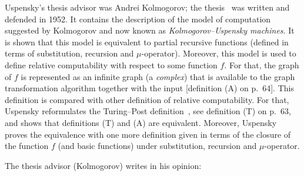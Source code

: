 \documentclass[12pt]{article}
\theoremstyle{remark}
\begin{document}
Uspensky's thesis advisor was Andrei Kolmogorov; the thesis~\cite{1952} was written and defended in 1952. It contains the description of the model of computation suggested by Kolmogorov and now known as \emph{Kolmogorov--Uspensky machines}. It is shown that this model is equivalent to partial recursive functions (defined in terms of substitution, recursion and $\mu$-operator). Moreover, this model is used to define relative computability with respect to some function $f$. For that, the graph of $f$ is represented as an infinite graph (a \emph{complex}) that is available to the graph transformation algorithm together with the input [definition (A) on p.~64]. This definition is compared with other definition of relative computability. For that, Uspensky reformulates the Turing--Post definition~\cite{Turing1939,Post1944}, see  definition (T) on p.~63, and shows that definitions (T) and (A) are equivalent. Moreover, Uspensky proves the equivalence with one more definition given in terms of the closure of the function $f$ (and basic functions) under substitution, recursion and $\mu$-operator. 

The thesis advisor (Kolmogorov) writes in his opinion:
\end{document}
